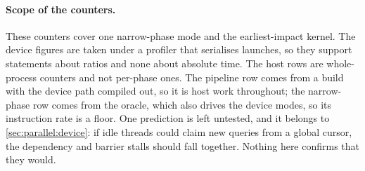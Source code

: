 \paragraph{Scope of the counters.} These counters cover one narrow-phase mode
and the earliest-impact kernel. The device figures are taken under a profiler
that serialises launches, so they support statements about ratios and none about
absolute time. The host rows are whole-process counters and not per-phase ones.
The pipeline row comes from a build with the device path compiled out, so it is
host work throughout; the narrow-phase row comes from the oracle, which also
drives the device modes, so its instruction rate is a floor. One prediction is
left untested, and it belongs to \cref{sec:parallel:device}: if idle threads
could claim new queries from a global cursor, the dependency and barrier stalls
should fall together. Nothing here confirms that they would.








